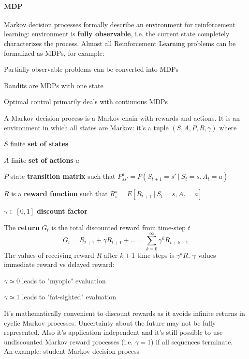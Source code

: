 \documentclass[10pt]{report}
\begin{document}
\paragraph{MDP} Markov decision processes formally describe an environment for reinforcement learning: environment is \textbf{fully observable}, i.e. the current state completely characterizes the process. Almost all Reinforcement Learning problems can be formalized as MDPs, for example:
\begin{list}{}{}
	\item Partially observable problems can be converted into MDPs
	\item Bandits are MDPs with one state
	\item Optimal control primarily deals with continuous MDPs
\end{list}
A Markov decision process is a Markov chain with rewards and actions. It is an environment in which all states are Markov: it's a tuple $(S, A, P, R, \gamma)$ where\begin{list}{}{}
	\item $S$ finite \textbf{set of states}
	\item $A$ finite \textbf{set of actions} $a$
	\item $P$ state \textbf{transition matrix} such that $P_{ss'}^a = P(S_{t+1}=s'\:|\:S_t=s, A_t=a)$
	\item $R$ is a \textbf{reward function} such that $R_s^a = E[R_{t+1}\:|\:S_t=s,A_t=a]$
	\item $\gamma\in [0,1]$ \textbf{discount factor}
\end{list}
The \textbf{return} $G_t$ is the total discounted reward from time-step $t$
$$G_t = R_{t+1} + \gamma R_{t+1}+\ldots = \sum_{k=0}^\infty \gamma^kR_{t+k+1}$$
The values of receiving reward $R$ after $k+1$ time steps is $\gamma^k R$. $\gamma$ values immediate reward vs delayed reward:
\begin{list}{}{}
	\item $\gamma\simeq 0$ leads to "myopic" evaluation
	\item $\gamma\simeq 1$ leads to "fat-sighted" evaluation
\end{list}
It's mathematically convenient to discount rewards as it avoids infinite returns in cyclic Markov processes. Uncertainty about the future may not be fully represented. Also it's application independent and it's still possible to use undiscounted Markov reward processes (i.e. $\gamma=1$) if all sequences terminate.\\
An example: student Markov decision process
\end{document}
